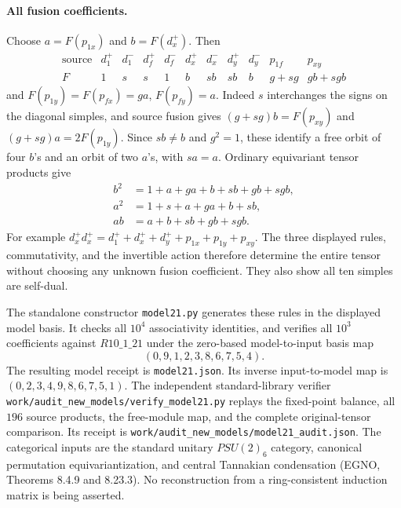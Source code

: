 \paragraph{All fusion coefficients.}
Choose $a=F(p_{1x})$ and $b=F(d_x^+)$. Then
\[
\begin{array}{c|cccccccccc}
\text{source}&d_1^+&d_1^-&d_f^+&d_f^-&d_x^+&d_x^-&d_y^+&d_y^-&p_{1f}&p_{xy}\\
F&1&s&s&1&b&sb&sb&b&g+sg&gb+sgb
\end{array}
\]
and $F(p_{1y})=F(p_{fx})=ga$, $F(p_{fy})=a$.
Indeed $s$ interchanges the signs on the diagonal simples, and source
fusion gives $(g+sg)b=F(p_{xy})$ and $(g+sg)a=2F(p_{1y})$.
Since $sb\ne b$ and $g^2=1$, these identify a free orbit of four $b$'s
and an orbit of two $a$'s, with $sa=a$.
Ordinary equivariant tensor products give
\[
\begin{split}
b^2&=1+a+ga+b+sb+gb+sgb,\\
a^2&=1+s+a+ga+b+sb,\\
ab&=a+b+sb+gb+sgb.
\end{split}
\]
For example $d_x^+d_x^+=d_1^++d_x^++d_y^++p_{1x}+p_{1y}+p_{xy}$.
The three displayed rules, commutativity, and the invertible action
therefore determine the entire tensor without choosing any unknown
fusion coefficient. They also show all ten simples are self-dual.

The standalone constructor \nolinkurl{model21.py} generates these rules in the displayed model basis. It checks all $10^4$ associativity
identities, and verifies all $10^3$ coefficients against $R10\_1\_21$
under the zero-based model-to-input basis map
\[
(0,9,1,2,3,8,6,7,5,4).
\]
The resulting model receipt is \nolinkurl{model21.json}. Its inverse
input-to-model map is $(0,2,3,4,9,8,6,7,5,1)$. The independent standard-library
verifier \nolinkurl{work/audit_new_models/verify_model21.py} replays the
fixed-point balance, all $196$ source products, the free-module map, and
the complete original-tensor comparison. Its receipt is
\nolinkurl{work/audit_new_models/model21_audit.json}.
The categorical inputs are the standard unitary $PSU(2)_6$ category,
canonical permutation equivariantization, and central Tannakian
condensation (EGNO, Theorems 8.4.9 and 8.23.3). No reconstruction from
a ring-consistent induction matrix is being asserted.
